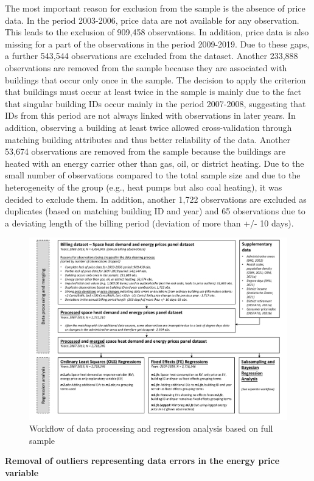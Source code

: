 \documentclass[12pt,twoside]{reedthesis}
\begin{document}
The most important reason for exclusion from the sample is the absence of price data. In the period 2003-2006, price data are not available for any observation. This leads to the exclusion of 909,458 observations. In addition, price data is also missing for a part of the observations in the period 2009-2019. Due to these gaps, a further 543,544 observations are excluded from the dataset. Another 233,888 observations are removed from the sample because they are associated with buildings that occur only once in the sample. The decision to apply the criterion that buildings must occur at least twice in the sample is mainly due to the fact that singular building IDs occur mainly in the period 2007-2008, suggesting that IDs from this period are not always linked with observations in later years. In addition, observing a building at least twice allowed cross-validation through matching building attributes and thus better reliability of the data. Another 53,674 observations are removed from the sample because the buildings are heated with an energy carrier other than gas, oil, or district heating. Due to the small number of observations compared to the total sample size and due to the heterogeneity of the group (e.g., heat pumps but also coal heating), it was decided to exclude them. In addition, another 1,722 observations are excluded as duplicates (based on matching building ID and year) and 65 observations due to a deviating length of the billing period (deviation of more than +/- 10 days).
\begin{figure}

{\centering \includegraphics[width=1.03\linewidth]{figure/workflow_diagramm_part1} 

}

\caption{Workflow of data processing and regression analysis based on full sample}\label{fig:workflow1}
\end{figure}
\textbf{Removal of outliers representing data errors in the energy price variable}
\end{document}
